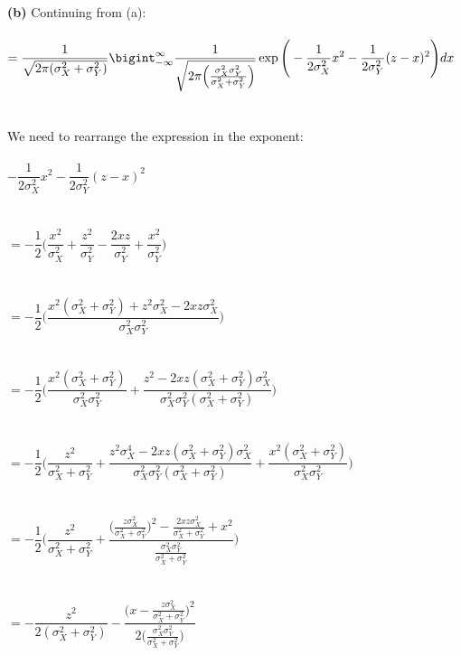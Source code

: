 \documentclass[submit]{harvardml}
\begin{document}
\textbf{(b)} Continuing from (a):\\\\
$=\displaystyle\dfrac{1}{\sqrt{2\pi(\sigma_X^{2}+\sigma_Y^{2})}}\displaystyle\bigint_{-\infty}^{\infty}\displaystyle\dfrac{1}{\sqrt{2\pi\Big(\frac{\sigma_X^{2}\sigma_Y^{2}}{\sigma_X^{2}+\sigma_Y^{2}}\Big)}}\exp\Bigg(-\displaystyle\dfrac{1}{2\sigma_X^{2}}x^{2}-\displaystyle\dfrac{1}{2\sigma_Y^{2}}(z-x)^{2}\Bigg)dx$\\\\\\
We need to rearrange the expression in the exponent:\\\\
$-\displaystyle\dfrac{1}{2\sigma_X^{2}}x^{2}-\displaystyle\dfrac{1}{2\sigma_Y^{2}}(z-x)^{2}$\\\\\\
$=-\dfrac{1}{2}\Bigg(\dfrac{x^2}{\sigma_X^2}+\dfrac{z^2}{\sigma_Y^2}-\dfrac{2xz}{\sigma_Y^2}+\dfrac{x^2}{\sigma_Y^2}\Bigg)$\\\\\\
$=-\dfrac{1}{2}\Bigg(\dfrac{x^2(\sigma_X^2+\sigma_Y^2)+z^2\sigma_X^2-2xz\sigma_X^2}{\sigma_X^2\sigma_Y^2}\Bigg)$\\\\\\
$=-\dfrac{1}{2}\Bigg(\dfrac{x^2(\sigma_X^2+\sigma_Y^2)}{\sigma_X^2\sigma_Y^2}+\dfrac{z^2-2xz(\sigma_X^2+\sigma_Y^2)\sigma_X^2}{\sigma_X^2\sigma_Y^2(\sigma_X^2+\sigma_Y^2)}\Bigg)$\\\\\\
$=-\dfrac{1}{2}\Bigg(\dfrac{z^2}{\sigma_X^2+\sigma_Y^2}+\dfrac{z^2\sigma_X^4-2xz(\sigma_X^2+\sigma_Y^2)\sigma_X^2}{\sigma_X^2\sigma_Y^2(\sigma_X^2+\sigma_Y^2)}+\dfrac{x^2(\sigma_X^2+\sigma_Y^2)}{\sigma_X^2\sigma_Y^2}\Bigg)$\\\\\\
$=-\dfrac{1}{2}\Bigg(\dfrac{z^2}{\sigma_X^2+\sigma_Y^2}+\dfrac{\Big(\frac{z\sigma_X^2}{\sigma_X^2+\sigma_Y^2}\Big)^2-\frac{2xz\sigma_X^2}{\sigma_X^2+\sigma_Y^2}+x^2}{\frac{\sigma_X^2\sigma_Y^2}{\sigma_X^2+\sigma_Y^2}}\Bigg)$\\\\\\
$=-\dfrac{z^2}{2(\sigma_X^2+\sigma_Y^2)}-\dfrac{\Big(x-\frac{z\sigma_X^2}{\sigma_X^2+\sigma_Y^2}\Big)^2}{2\Big(\frac{\sigma_X^2\sigma_Y^2}{\sigma_X^2+\sigma_Y^2}\Big)}$\\\\\\
\end{document}
